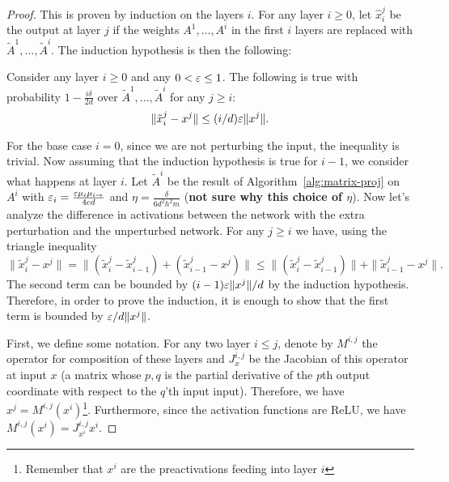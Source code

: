 \begin{proof}
This is proven by induction on the layers $i$. For any layer $i\geq 0$, let $\hat{x}^j_i$ be the output at layer $j$ if the weights $A^1,\dots,A^i$ in the first $i$ layers are replaced with $\tilde{A}^1,\dots,\tilde{A}^i$. The induction hypothesis is then the following:

    Consider any layer $i\geq 0$ and any $0<\eps\leq 1$. The following is true with probability $1-\frac{i\delta}{2d}$ over $\tilde{A}^1,\dots,\tilde{A}^i$ for any $j\geq i$:
    $$
    \|\tilde{x}^j_i - x^j\|\le (i/d)\eps\|x^j\|.
    $$

    For the base case $i = 0$, since we are not perturbing the input, the inequality is trivial. Now assuming that the induction hypothesis is true for $i-1$, we consider what happens at layer $i$. Let $\tilde{A}^i$ be the result of Algorithm~\ref{alg:matrix-proj} on $A^i$ with $\eps_i=\frac{\eps\mu_i\icu}{4cd}$ and $\eta = \frac{\delta}{6d^2h^2m}$ (\textbf{not sure why this choice of $\eta$}). Now let's analyze the difference in activations between the network with the extra perturbation and the unperturbed network. For any $j \ge i$ we have, using the triangle inequality
    \begin{equation}
    \|\tilde{x}^j_i - x^j\| = \|(\tilde{x}^j_i - \tilde{x}^j_{i-1})+(\tilde{x}^j_{i-1} - x^j)\| \leq \|(\tilde{x}^j_i - \tilde{x}^j_{i-1})\| +\|\tilde{x}^j_{i-1} - x^j\|.
    \label{eq:activation-error}
    \end{equation}
    The second term can be bounded by $(i-1)\eps\|x^j\|/d$ by the induction hypothesis. Therefore, in order to prove the induction, it is enough to show that the first term is bounded by $\eps/d \|x^j\|$. 

    First, we define some notation. For any two layer $i\leq j$, denote by $M^{i,j}$ the operator for composition of these layers and $J^{i,j}_x$ be the Jacobian of this operator at input $x$ (a matrix whose $p, q$ is the partial derivative of the $p$th output coordinate with respect to the $q$'th input input). Therefore, we have $x^j = M^{i,j}(x^i)$\footnote{Remember that $x^i$ are the preactivations feeding into layer $i$}. Furthermore, since the activation functions are ReLU, we have $M^{i,j}(x^i) =J^{i,j}_{x^i} x^i$.


\end{proof}
